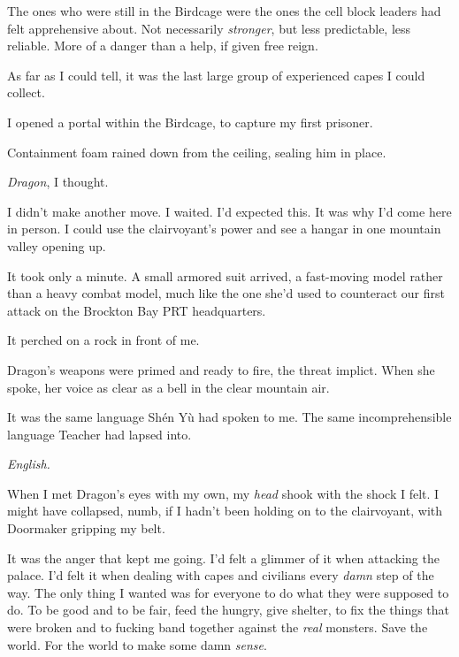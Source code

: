 The ones who were still in the Birdcage were the ones the cell block leaders had felt apprehensive about.  Not necessarily \emph{stronger}, but less predictable, less reliable.  More of a danger than a help, if given free reign.



As far as I could tell, it was the last large group of experienced capes I could collect.



I opened a portal within the Birdcage, to capture my first prisoner.



Containment foam rained down from the ceiling, sealing him in place.



\emph{Dragon}, I thought.



I didn't make another move.  I waited.  I'd expected this.  It was why I'd come here in person.  I could use the clairvoyant's power and see a hangar in one mountain valley opening up.



It took only a minute.  A small armored suit arrived, a fast-moving model rather than a heavy combat model, much like the one she'd used to counteract our first attack on the Brockton Bay PRT headquarters.



It perched on a rock in front of me.



Dragon's weapons were primed and ready to fire, the threat implict.  When she spoke, her voice as clear as a bell in the clear mountain air.



It was the same language Sh\'{e}n Y\`{u} had spoken to me.  The same incomprehensible language Teacher had lapsed into.



\emph{English.}



When I met Dragon's eyes with my own, my \emph{head} shook with the shock I felt.  I might have collapsed, numb, if I hadn't been holding on to the clairvoyant, with Doormaker gripping my belt.



It was the anger that kept me going.  I'd felt a glimmer of it when attacking the palace.  I'd felt it when dealing with capes and civilians every \emph{damn} step of the way.  The only thing I wanted was for everyone to do what they were supposed to do.  To be good and to be fair, feed the hungry, give shelter, to fix the things that were broken and to fucking band together against the \emph{real} monsters.  Save the world.  For the world to make some damn \emph{sense}.



